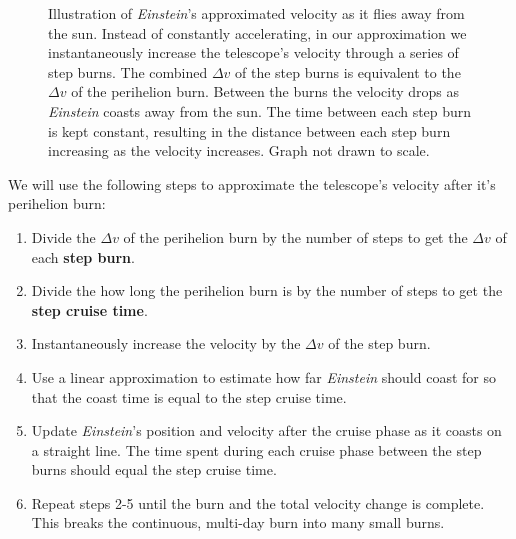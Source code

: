 \documentclass[12pt]{article} %
\begin{document}
\begin{figure}[H]
	\caption{Illustration of \textit{Einstein}'s approximated velocity as it flies away from the sun. Instead of constantly accelerating, in our approximation we instantaneously increase the telescope's velocity through a series of step burns. The combined $\Delta v$ of the step burns is equivalent to the $\Delta v$ of the perihelion burn. Between the burns the velocity drops as \textit{Einstein} coasts away from the sun. The time between each step burn is kept constant, resulting in the distance between each step burn increasing as the velocity increases. Graph not drawn to scale.}
	\label{fig:sawtooth}
\end{figure}

We will use the following steps to approximate the telescope's velocity after it's perihelion burn:

\begin{enumerate}
\item Divide the $\Delta v$ of the perihelion burn by the number of steps to get the $\Delta v$ of each \textbf{step burn}.
\item Divide the how long the perihelion burn is by the number of steps to get the \textbf{step cruise time}. 
\item Instantaneously increase the velocity by the $\Delta v$ of the step burn.
\item Use a linear approximation to estimate how far \textit{Einstein} should coast for so that the coast time is equal to the step cruise time.
\item Update \textit{Einstein}'s position and velocity after the cruise phase as it coasts on a straight line. The time spent during each cruise phase between the step burns should equal the step cruise time.
\item Repeat steps 2-5 until the burn and the total velocity change is complete. This breaks the continuous, multi-day burn into many small burns.
\end{enumerate}
\end{document}
